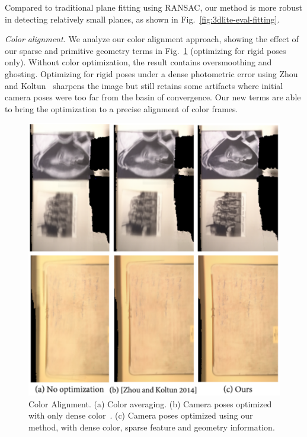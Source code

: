 Compared to traditional plane fitting using RANSAC, our method is more robust in detecting relatively small planes, as shown in Fig.~\ref{fig:3dlite-eval-fitting}.

\emph{Color alignment.}
We analyze our color alignment approach, showing the effect of our sparse and primitive geometry terms in Fig.~\ref{fig:3dlite-eval-align-rigid} (optimizing for rigid poses only).
Without color optimization, the result contains oversmoothing and ghosting. 
Optimizing for rigid poses under a dense photometric error using Zhou and Koltun~\cite{zhou2014color} sharpens the image but still retains some artifacts where initial camera poses were too far from the basin of convergence.
Our new terms are able to bring the optimization to a precise alignment of color frames.

\begin{figure}
\begin{minipage}{0.49\linewidth}
\centering
\includegraphics[width=\linewidth]{3dlite/fig17.png}
\caption{Color Alignment. (a) Color averaging. (b) Camera poses optimized with only dense color~\cite{zhou2014color}. (c) Camera poses optimized using our method, with dense color, sparse feature and geometry information.}
\label{fig:3dlite-eval-align-rigid}

\end{minipage}
\end{figure}
